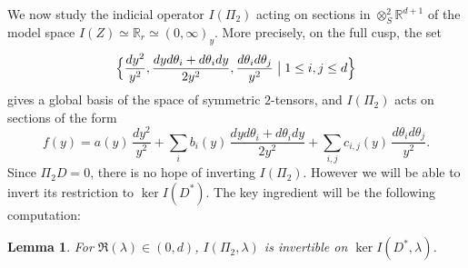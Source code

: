 \documentclass[JEP,XML,SOM,Unicode,NoFloatCountersInSection]{cedram}
\newcommand{\R}{\mathbb{R}}
\theoremstyle{plain}
\newtheorem{lemma}{Lemma}[section]
\theoremstyle{definition}
\begin{document}
We now study the indicial operator $I(\Pi_2)$ acting on sections in $\otimes^2_S \R^{d+1}$ of the model space $I(Z) \simeq \R_r \simeq (0,\infty)_y$. More precisely, on the full cusp, the set
\[
\Bigl\{ \dfrac{dy^2}{y^2}, \dfrac{dyd\theta_i+d\theta_i dy}{2y^2}, \dfrac{d\theta_i d\theta_j}{y^2} \bigm| 1 \leq i,j \leq d \Bigl\}
\]
gives a global basis of the space of symmetric $2$-tensors, and $I(\Pi_2)$ acts on sections of the form
\[
f(y) = a(y)\,\dfrac{dy^2}{y^2} + \sum_i b_i(y)\, \dfrac{dyd\theta_i+d\theta_i dy}{2y^2} + \sum_{i,j} c_{i,j}(y)\, \dfrac{d\theta_id\theta_j}{y^2}.
\]
Since $\Pi_2 D = 0$, there is no hope of inverting $I(\Pi_2)$. However we will be able to invert its restriction to $\ker I(D^\ast)$. The key ingredient will be the following computation:
\begin{lemma}\label{lemma:indicial-computations}
For $\Re(\lambda) \in (0,d)$, $I(\Pi_2, \lambda)$ is invertible on $\ker I(D^\ast,\lambda)$.
\end{lemma}
\end{document}
